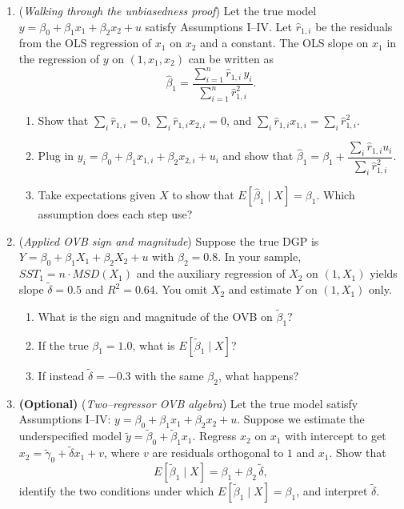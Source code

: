 \documentclass[12pt]{article}
\begin{document}
\begin{enumerate}\itemsep3em

\item (\emph{Walking through the unbiasedness proof})  
Let the true model $y=\beta_0+\beta_1 x_1+\beta_2 x_2+u$ satisfy Assumptions I--IV. Let $\hat r_{1,i}$ be the residuals from the OLS regression of $x_1$ on $x_2$ and a constant. The OLS slope on $x_1$ in the regression of $y$ on $(1,x_1,x_2)$ can be written as
\[
\hat\beta_1=\frac{\sum_{i=1}^n \hat r_{1,i}\,y_i}{\sum_{i=1}^n \hat r_{1,i}^2}.
\]
\begin{enumerate}\itemsep12em
    \item Show that $\sum_i \hat r_{1,i}=0$, $\sum_i \hat r_{1,i}x_{2,i}=0$, and $\sum_i \hat r_{1,i}x_{1,i}=\sum_i \hat r_{1,i}^2$.
    \item Plug in $y_i=\beta_0+\beta_1 x_{1,i}+\beta_2 x_{2,i}+u_i$ and show that $\hat\beta_1=\beta_1+\dfrac{\sum_i \hat r_{1,i}u_i}{\sum_i \hat r_{1,i}^2}$.
    \item Take expectations given $X$ to show that $E[\hat\beta_1\mid X]=\beta_1$. Which assumption does each step use?
\end{enumerate}

\clearpage
\item (\emph{Applied OVB sign and magnitude})  
Suppose the true DGP is $Y=\beta_0+\beta_1 X_1+\beta_2 X_2+u$ with $\beta_2=0.8$. In your sample, $SST_1=n\cdot MSD(X_1)$ and the auxiliary regression of $X_2$ on $(1,X_1)$ yields slope $\tilde\delta=0.5$ and $R^2=0.64$. You omit $X_2$ and estimate $Y$ on $(1,X_1)$ only.
\begin{enumerate}\itemsep8em
    \item What is the sign and magnitude of the OVB on $\tilde\beta_1$?
    \item If the true $\beta_1=1.0$, what is $E[\tilde\beta_1\mid X]$?
    \item If instead $\tilde\delta=-0.3$ with the same $\beta_2$, what happens?
\end{enumerate}

\clearpage
\item \textbf{(Optional)} (\emph{Two–regressor OVB algebra})  
Let the true model satisfy Assumptions I–IV: $y=\beta_0+\beta_1 x_1+\beta_2 x_2+u$. Suppose we estimate the underspecified model $\tilde y=\tilde\beta_0+\tilde\beta_1 x_1$. Regress $x_2$ on $x_1$ with intercept to get $x_2=\tilde\gamma_0+\tilde\delta x_1+v$, where $v$ are residuals orthogonal to $1$ and $x_1$. Show that  
\[
E[\tilde\beta_1\mid X]=\beta_1+\beta_2\,\tilde\delta,
\]
identify the two conditions under which $E[\tilde\beta_1\mid X]=\beta_1$, and interpret $\tilde\delta$.

\end{enumerate}
\end{document}
